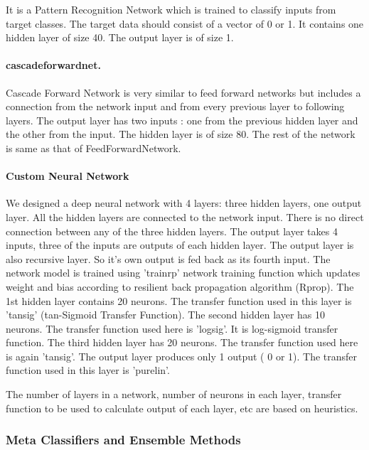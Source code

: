  It is a Pattern Recognition Network which is trained to classify inputs from target classes. The target data should consist of a vector of 0 or 1. It contains one hidden layer of size 40. The output layer is of size 1.


\paragraph{cascadeforwardnet.}  Cascade Forward Network is very similar to feed forward networks but includes a connection from the network input and from every previous layer to following layers. The output layer has two inputs : one from the previous hidden layer and the other from the input. The hidden layer is of size 80. The rest of the network is same as that of FeedForwardNetwork.  


\paragraph{Custom Neural Network}  We designed a deep neural network with 4 layers: three hidden layers, one output layer. All the hidden layers are connected to the network input.  There is no direct connection between any of the three hidden layers. The output layer takes 4 inputs, three of the inputs are outputs of each hidden layer. The output layer is also recursive layer. So it's own output is fed back as its fourth input. The network model is trained using 'trainrp' network training function which updates weight and bias according to resilient back propagation algorithm (Rprop).
The 1st hidden layer contains 20 neurons. The transfer function used in this layer is 'tansig' (tan-Sigmoid Transfer Function). The second hidden layer has 10 neurons. The transfer function used here is 'logsig'. It is log-sigmoid transfer function. The third hidden layer has 20 neurons. The transfer function used here is again 'tansig'.  The output layer produces only 1 output ( 0 or 1). The transfer function used in this layer is 'purelin'.


The number of layers in a network, number of neurons in each layer, transfer function to be used to calculate output of each layer, etc are based on heuristics. 




\subsubsection{Meta Classifiers and Ensemble Methods}

